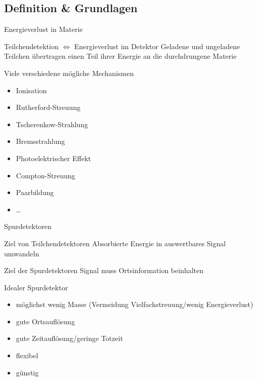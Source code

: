 
\subsection[]{Definition \& Grundlagen}





\begin{frame}{Energieverlust in Materie}
	\begin{block}{Teilchendetektion $\Leftrightarrow$ Energieverlust im Detektor}
		Geladene und ungeladene Teilchen übertragen einen Teil ihrer Energie an die
		durchdrungene Materie	
	\end{block}
	
	
	\begin{block}{Viele verschiedene mögliche Mechanismen}
		\begin{itemize}
		  \item Ionisation
		  \item Rutherford-Streuung
		  \item Tscherenkow-Strahlung
		  \item Bremsstrahlung
		  \item Photoelektrischer Effekt
		  \item Compton-Streuung
		  \item Paarbildung
		  \item \ldots
		\end{itemize}
	\end{block}
\end{frame}


\begin{frame}{Spurdetektoren}
	\begin{block}{Ziel von Teilchendetektoren}
		Absorbierte Energie in auswertbares Signal umwandeln 
	\end{block}
	\begin{block}{Ziel der Spurdetektoren}
		Signal muss Ortsinformation beinhalten
	\end{block}
	
	\begin{exampleblock}{Idealer Spurdetektor}
		\begin{itemize}
		  \item möglichst wenig Masse (Vermeidung Vielfachstreuung/wenig Energieverlust)
		  \item gute Ortsauflösung
		  \item gute Zeitauflösung/geringe Totzeit
		  \item flexibel
		  \item günstig 
		\end{itemize}
	\end{exampleblock}
\end{frame}

